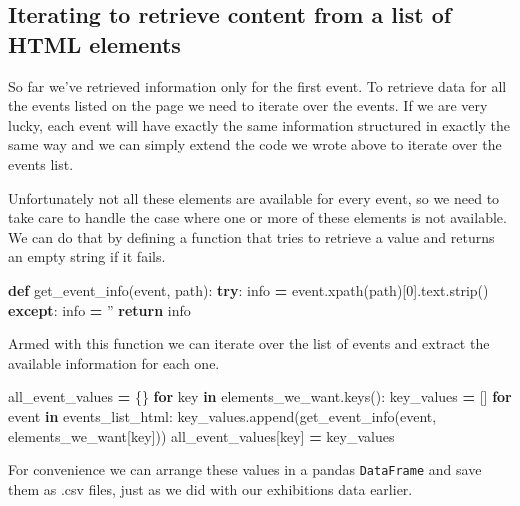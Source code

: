 \documentclass[]{book}
\newenvironment{Shaded}{\begin{snugshade}}{\end{snugshade}}
\newcommand{\KeywordTok}[1]{\textcolor[rgb]{0.13,0.29,0.53}{\textbf{#1}}}
\newcommand{\DecValTok}[1]{\textcolor[rgb]{0.00,0.00,0.81}{#1}}
\newcommand{\StringTok}[1]{\textcolor[rgb]{0.31,0.60,0.02}{#1}}
\newcommand{\ControlFlowTok}[1]{\textcolor[rgb]{0.13,0.29,0.53}{\textbf{#1}}}
\newcommand{\OperatorTok}[1]{\textcolor[rgb]{0.81,0.36,0.00}{\textbf{#1}}}
\newcommand{\NormalTok}[1]{#1}
\begin{document}
\subsection{Iterating to retrieve content from a list of HTML
elements}\label{iterating-to-retrieve-content-from-a-list-of-html-elements}

So far we've retrieved information only for the first event. To retrieve
data for all the events listed on the page we need to iterate over the
events. If we are very lucky, each event will have exactly the same
information structured in exactly the same way and we can simply extend
the code we wrote above to iterate over the events list.

Unfortunately not all these elements are available for every event, so
we need to take care to handle the case where one or more of these
elements is not available. We can do that by defining a function that
tries to retrieve a value and returns an empty string if it fails.

\begin{Shaded}
\begin{Highlighting}[]
\KeywordTok{def}\NormalTok{ get_event_info(event, path):}
    \ControlFlowTok{try}\NormalTok{:}
\NormalTok{        info }\OperatorTok{=}\NormalTok{ event.xpath(path)[}\DecValTok{0}\NormalTok{].text.strip()}
    \ControlFlowTok{except}\NormalTok{:}
\NormalTok{        info }\OperatorTok{=} \StringTok{''}
    \ControlFlowTok{return}\NormalTok{ info}
\end{Highlighting}
\end{Shaded}

Armed with this function we can iterate over the list of events and
extract the available information for each one.

\begin{Shaded}
\begin{Highlighting}[]
\NormalTok{all_event_values }\OperatorTok{=}\NormalTok{ \{\}}
\ControlFlowTok{for}\NormalTok{ key }\KeywordTok{in}\NormalTok{ elements_we_want.keys():}
\NormalTok{    key_values }\OperatorTok{=}\NormalTok{ []}
    \ControlFlowTok{for}\NormalTok{ event }\KeywordTok{in}\NormalTok{ events_list_html: }
\NormalTok{        key_values.append(get_event_info(event, elements_we_want[key]))}
\NormalTok{    all_event_values[key] }\OperatorTok{=}\NormalTok{ key_values}
\end{Highlighting}
\end{Shaded}

For convenience we can arrange these values in a pandas
\texttt{DataFrame} and save them as .csv files, just as we did with our
exhibitions data earlier.
\end{document}
